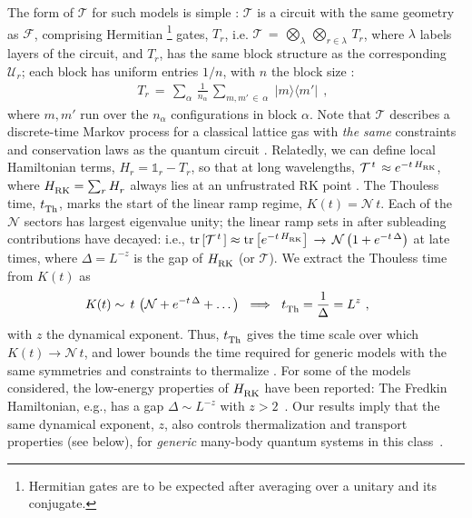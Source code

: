 \documentclass[prl,aps,amsfonts,twocolumn,superscriptaddress,notitlepage,floatfix]{revtex4-1}
\newcommand{\be}{\begin{eqnarray}}
\newcommand{\ee}{\end{eqnarray}}
\newcommand{\vpd}[0]{\vphantom{\dagger}}
\def\ket#1{{|#1\rangle}}
\def\bra#1{{\langle #1 |}}
\newcommand{\ident}[0]{ \mathbb{1}}
\newcommand{\tr}[1]{{\rm tr} \left[ #1 \right]}
\def\gate{\mathcal{U}}
\def\Floq{\mathcal{F}}
\def\Ham{H}
\def\Tmat{\mathcal{T}}
\def\Tgate{T}
\def\tth{t^{\vpd}_{\rm Th}}
\def\gap{\Delta}
\def\numsec{\mathcal{N}}
\begin{document}
The form of $\Tmat$ for such models is simple \cite{U1FRUC,SanjayAmosFracton,supp}: $\Tmat$ is a circuit with the same geometry as $\Floq$, comprising Hermitian \footnote{Hermitian gates are to be expected after averaging over a unitary and its conjugate.} gates, $\Tgate^{\,}_r$, i.e. $\Tmat \, = \, \bigotimes_{\lambda} \, \bigotimes_{r \in \lambda} \, \Tgate^{\,}_r $, where $\lambda$ labels layers of the circuit, and  $\Tgate^{\,}_r$, has the same block structure as the corresponding $\gate^{\,}_r$; each block has uniform entries $1/n$, with $n$ the block size \cite{U1FRUC,SanjayAmosFracton,supp}: 
\be \label{eq:Tgate} \Tgate^{\,}_r \, = \, \sum\limits_{\alpha} \,\frac{1}{n^{\,}_{\alpha}} \, \sum\limits_{m,m' \, \in\, \alpha \, } \, \ket{m}\bra{m'}~~,~~\ee
where $m,m'$ run over the $n^{\,}_{\alpha}$ configurations in block $\alpha$. Note that $\Tmat$ describes a discrete-time Markov process for a classical lattice gas with \emph{the same} constraints and conservation laws as the quantum circuit \cite{Schutz2001,U1FRUC,SanjayAmosFracton,supp}. Relatedly, we can define local Hamiltonian terms, $\Ham^{\,}_r = \ident^{\,}_r - \Tgate^{\,}_r$, so that at long wavelengths, $\Tmat^{\, t \,} \approx e^{- t \, \Ham^{\,}_{\rm RK}}$, where $\Ham^{\,}_{\rm RK} = \sum_r \Ham^{\,}_r$ always lies at an unfrustrated RK point \cite{RK,U1FRUC,SanjayAmosFracton}. The Thouless time, $\tth$, marks the start of the linear ramp regime, $K(t) = \numsec \, t$. Each of the $\numsec$ sectors has largest eigenvalue unity; the linear ramp sets in after subleading contributions have decayed: i.e., $\tr{ \Tmat^{\, t \,} } \approx \tr{ e^{- t \, \Ham^{\,}_{\rm RK} }} \,  \to  \, \numsec \left( 1 + e^{- t \, \gap } \right)$ at late times, where $\gap = L^{-z}$ is the gap of  $\Ham^{\,}_{\rm RK}$ (or $\Tmat$). We extract the Thouless time from $K(t)$ as \cite{ShenkerRMT,U1FRUC,SanjayAmosFracton}
\be \label{eq:ThoulessTime} K(t) \sim \, t \,  \left( \numsec  + e^{- t \, \gap} + \dots  \right)~\implies ~ \tth = \frac{1}{\gap} = L^z~,~~~~\ee
with $z$ the dynamical exponent. Thus, $\tth$ gives the time scale over which $K(t) \to \numsec \, t$, and lower bounds the time required for generic models with the same symmetries and constraints to thermalize \cite{SwingleSFFHydro,CDLC1,U1FRUC,SanjayAmosFracton,supp}. For some of the models considered, the low-energy properties of %
$\Ham^{\,}_{\rm RK}$ have been reported: The Fredkin Hamiltonian, e.g., has a gap $\Delta \sim L^{-z}$ with $z>2$~\cite{ChenFredkin2017,ChenFredkin2017a}. Our results imply that the same dynamical exponent, $z$, also controls thermalization and transport properties (see below), for {\em generic} many-body quantum systems %
in this class~\cite{ShenkerRMT}. 
\end{document}
